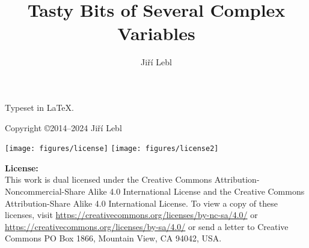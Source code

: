 \documentclass[12pt,openany]{book}
\author{Ji\v{r}\'i Lebl}
\title{Tasty Bits of Several Complex Variables}
\theoremstyle{plain}
\theoremstyle{remark}
\theoremstyle{definition}
\theoremstyle{exercise}
\theoremstyle{example}
\begin{document}
\ifpdf
\fi
\newlength{\centeroffset}
\setlength{\centeroffset}{-0.5\oddsidemargin}
\addtolength{\centeroffset}{0.5\evensidemargin}
\thispagestyle{empty}
\noindent\hspace*{\centeroffset}

\noindent\hspace*{\centeroffset}



\pagebreak

\vspace*{\fill}

\noindent
Typeset in \LaTeX.

\bigskip

\noindent
Copyright \copyright 2014--2024 Ji{\v r}\'i Lebl



\bigskip

\noindent
\texttt{[image: figures/license]}
\quad
\texttt{[image: figures/license2]}

\bigskip

\noindent
\textbf{License:}
\\
This work
is dual licensed under
the Creative Commons
Attribution-Non\-commercial-Share Alike 4.0 International License and
the Creative Commons
Attribution-Share Alike 4.0 International License.
To view a
copy of these licenses, visit
\url{https://creativecommons.org/licenses/by-nc-sa/4.0/}
or
\url{https://creativecommons.org/licenses/by-sa/4.0/}
or send a letter to
Creative Commons
PO Box 1866, Mountain View, CA 94042, USA\@.
\end{document}
